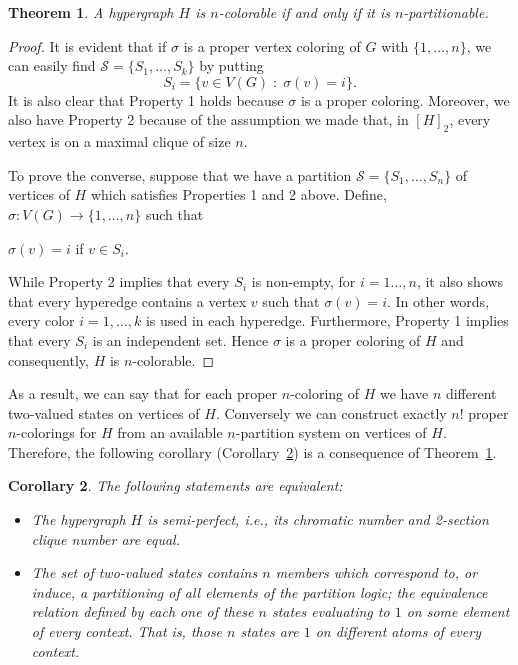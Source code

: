 \documentclass[%
12pt,
prereprint,
showpacs,
showkeys,
preprintnumbers,
amsmath,amssymb,
aps,
pra,
longbibliography,
notitlepage
]{revtex4-1}
\newtheorem{theorem}{{\color{THM} Theorem}}%
\newtheorem{corollary}[theorem]{{\color{THM}Corollary}}
\theoremstyle{definition}
\begin{document}
	\begin{theorem}\label{separable}
		A hypergraph $H$ is $n$-colorable if and only if it is $n$-partitionable.
	\end{theorem}
	\begin{proof}
		It is evident that if $\sigma$ is a proper vertex coloring of $G$ with $\{1,\ldots , n\}$, we can easily find $\mathcal{S}=\{S_1 , \ldots , S_k \}$ by putting $$S_i =\{v\in V(G)\; : \; \sigma(v)=i \}.$$ It is also clear that Property 1 holds because $\sigma$ is a proper coloring. Moreover, we also have Property 2 because of the assumption we made that, in $[H]_2$, every vertex is on a maximal clique of size $n$.
		
		To prove the converse, suppose that we have a partition $\mathcal{S}=\{S_1 , \ldots , S_n \}$ of vertices of $H$ which satisfies Properties 1 and 2 above. Define, $\sigma: V(G) \longrightarrow \{1,\ldots , n\}$ such that
		
		\begin{center}
			$\sigma(v)=i$ if $v\in S_i.$
		\end{center}
		
		While Property 2 implies that every $S_i$ is non-empty, for $i=1\ldots , n$, it also shows that every hyperedge contains a vertex $v$ such that $\sigma (v)=i$. In other words, every color $i=1,\ldots,k$ is used in each hyperedge. Furthermore, Property 1 implies that every $S_i$ is an independent set. Hence $\sigma$ is a proper coloring of $H$ and consequently, $H$ is $n$-colorable.
	\end{proof}
	
	As a result, we can say that for each proper $n$-coloring of $H$ we have $n$ different two-valued states on vertices of $H$. Conversely we can construct exactly $n!$ proper $n$-colorings for $H$ from an available $n$-partition system on vertices of $H$. %
	Therefore, the following corollary (Corollary~\ref{c1}) is a consequence of Theorem~\ref{separable}.
	
	\begin{corollary}\label{c1} The following statements are equivalent:
		
		\begin{itemize}
			\item[(i)]
			The hypergraph $H$ is semi-perfect, i.e., its chromatic number and 2-section clique number are equal.%
			\item[(ii)]
			The set of two-valued states contains $n$ members which correspond
			to, or induce, a partitioning of all elements of the partition logic;
			the equivalence relation defined by each one of these $n$ states evaluating to $1$ on some element of every context.
			That is, those $n$ states are $1$ on different atoms of every context.
		\end{itemize}
	\end{corollary}
	
\end{document}
